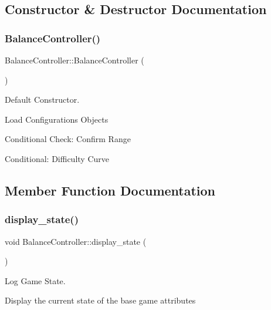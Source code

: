 \subsection{Constructor \& Destructor Documentation}
\mbox{\label{classBalanceController_a525efc25f5f4876cbff5ca052d7c55f6}} 
\subsubsection{\texorpdfstring{Balance\+Controller()}{BalanceController()}}
{\footnotesize\ttfamily Balance\+Controller\+::\+Balance\+Controller (\begin{DoxyParamCaption}{ }\end{DoxyParamCaption})\hspace{0.3cm}{\ttfamily [protected]}}



Default Constructor. 

Load Configurations Objects

Conditional Check\+: Confirm Range

Conditional\+: Difficulty Curve 

\subsection{Member Function Documentation}
\mbox{\label{classBalanceController_a13eb2d765e0aa528b131b32dd1940fac}} 
\subsubsection{\texorpdfstring{display\+\_\+state()}{display\_state()}}
{\footnotesize\ttfamily void Balance\+Controller\+::display\+\_\+state (\begin{DoxyParamCaption}{ }\end{DoxyParamCaption})}



Log Game State. 

Display the current state of the base game attributes \mbox{\label{classBalanceController_a68f4371ae68f48c5040906949cab77b4}} 
